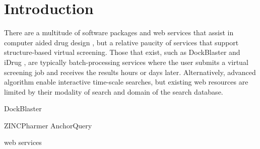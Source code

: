 \section{Introduction}

There are a multitude of software packages and web services that assist in computer aided drug design \cite{Villoutreix_2013}, but a relative paucity of services that support structure-based virtual screening.  Those that exist, such as DockBlaster \cite{Irwin_2009} and iDrug \cite{Wang_2014}, are typically batch-processing services where the user submits a virtual screening job and receives the results hours or days later.  Alternatively, advanced algorithm enable interactive time-scale searches, but existing web resources \cite{Koes_2012}
are limited by their modality of search and domain of the search database.



DockBlaster \cite{Irwin_2009}

ZINCPharmer  \cite{Koes_2012}
AnchorQuery \cite{Koes_2012}

web services 